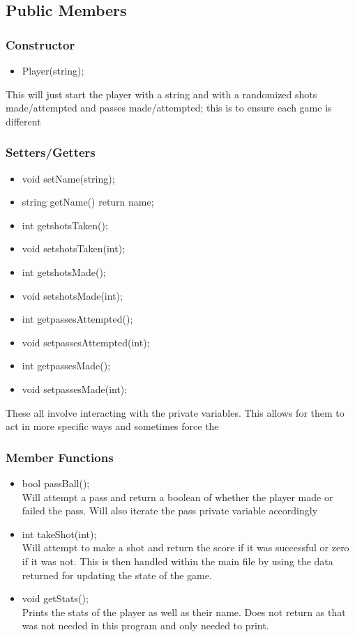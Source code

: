 \documentclass[11pt]{article}
\begin{document}
\subsection{Public Members}
\subsubsection{Constructor}
\begin{itemize}
\item Player(string);
\end{itemize}
This will just start the player with a string and with a randomized shots made/attempted and passes made/attempted; this is to ensure each game is different
\subsubsection{Setters/Getters}
\begin{itemize}
\item 	void setName(string);
\item 	string getName() {return name;}
\item 	int getshotsTaken();
\item 	void setshotsTaken(int);
\item	int getshotsMade();
\item	void setshotsMade(int);
\item	int getpassesAttempted();
\item	void setpassesAttempted(int);
\item	int getpassesMade();
\item	void setpassesMade(int);
\end{itemize}
These all involve interacting with the private variables. This allows for them to act in more specific ways and sometimes force the 
\subsubsection{Member Functions}
\begin{itemize}
\item	bool passBall();\\
Will attempt a pass and return a boolean of whether the player made or failed the pass. Will also iterate the pass private variable accordingly
\item	int takeShot(int);\\
Will attempt to make a shot and return the score if it was successful or zero if it was not. This is then handled within the main file by using the data returned for updating the state of the game.
\item	void getStats();\\
Prints the stats of the player as well as their name. Does not return as that was not needed in this program and only needed to print.
\end{itemize}
\end{document}
